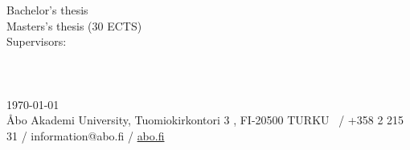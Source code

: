 \documentclass[
21pt, %
oneside, %
english, %
onehalfspacing, %
nolistspacing, %
headsepline, %
chapterinoneline, %
]{MastersDoctoralThesis} %
\begin{document}
\begin{titlepage}
\begin{bottompar}
        \begin{flushright}
            \ifdefined\swedishthesis
                Bachelor's thesis  \\
            \else
                Masters's thesis (30 ECTS)  \\
                Supervisors: \supname \\
            \fi
            \deptname \\
            \facname \\
            \univname \\
            \today\\%
            \vspace{5 mm}
            {\fontsize{8pt}{1em}\selectfont Åbo Akademi University, Tuomiokirkontori 3 , FI-20500 TURKU  ~/ +358 2 215 31 / information@abo.fi  / \href{http://abo.fi}{abo.fi}
            }
        \end{flushright}
    \end{bottompar}

\end{titlepage}
\restoregeometry



\end{document}
